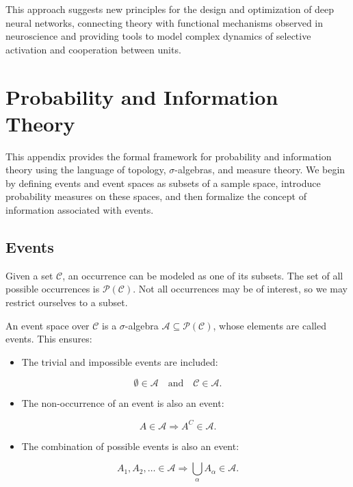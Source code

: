 \documentclass[12pt]{article}
\begin{document}
This approach suggests new principles for the design and optimization of deep neural networks, connecting theory with functional mechanisms observed in neuroscience and providing tools to model complex dynamics of selective activation and cooperation between units.
\newpage


\section*{Probability and Information Theory}

This appendix provides the formal framework for probability and information theory using 
the language of topology, $\sigma$-algebras, and measure theory. We begin by defining events 
and event spaces as subsets of a sample space, introduce probability measures on these 
spaces, and then formalize the concept of information associated with events.
\subsection*{Events}

Given a set $\mathcal{C}$, an occurrence can be modeled as one of its subsets. The set of all possible occurrences is $\mathcal{P}(\mathcal{C})$. Not all occurrences may be of interest, so we may restrict ourselves to a subset.

An event space over $\mathcal{C}$ is a $\sigma$-algebra $\mathcal{A} \subseteq \mathcal{P}(\mathcal{C})$, whose elements are called events. This ensures:

\begin{itemize}
  \item The trivial and impossible events are included:
\end{itemize}
\begin{equation}
\emptyset \in \mathcal{A} \quad \text{and} \quad \mathcal{C} \in \mathcal{A}.
\end{equation}

\begin{itemize}
  \item The non-occurrence of an event is also an event:
\end{itemize}
\begin{equation}
A \in \mathcal{A} \Rightarrow A^C \in \mathcal{A}.
\end{equation}

\begin{itemize}
  \item The combination of possible events is also an event:
\end{itemize}
\begin{equation}
A_1, A_2, \dots \in \mathcal{A} \Rightarrow \bigcup_{\alpha} A_{\alpha} \in \mathcal{A}.
\end{equation}
\end{document}
